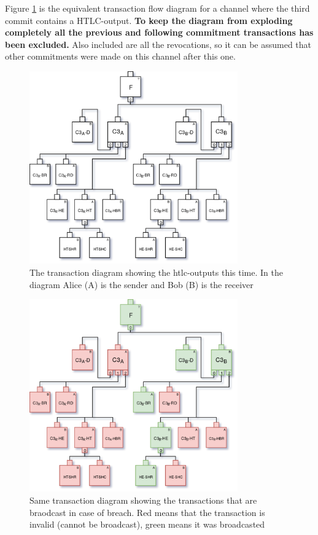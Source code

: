 Figure \ref{fig:pc-htlc} is the equivalent transaction flow diagram for a channel where the third commit contains a HTLC-output. \textbf{To keep the diagram from exploding completely all the previous and following commitment transactions has been excluded.} Also included are all the revocations, so it can be assumed that other commitments were made on this channel after this one.  

\begin{figure}[H]
	\centering
	\includegraphics[width=0.80\textwidth]{background/images/payment_channel_htlc.png}
	\caption{The transaction diagram showing the htlc-outputs this time. In the diagram Alice (A) is the sender and Bob (B) is the receiver}
	\label{fig:pc-htlc}
\end{figure}

\begin{figure}[H]
	\centering
	\includegraphics[width=0.80\textwidth]{background/images/payment_channel_htlc_revoked_alice.png}
	\caption{Same transaction diagram showing the transactions that are braodcast in case of breach. Red means that the transaction is invalid (cannot be broadcast), green means it was broadcasted}
	\label{fig:pc-htlc-revoked-alice}
\end{figure}

